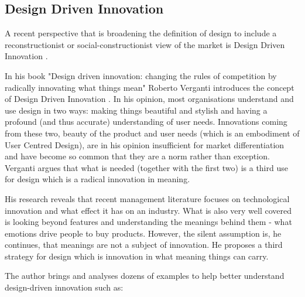 		\subsection{Design Driven Innovation}

A recent perspective that is broadening the definition of design to include a reconstructionist \citep{chan2005blue} or social-constructionist \citep{Prahalad2000} view of the market is Design Driven Innovation \citep{Liem2011, verganti2013design}.   

In his book "Design driven innovation: changing the rules of competition by radically innovating what things mean" Roberto Verganti introduces the concept of Design Driven Innovation \citep{verganti2013design}. In his opinion, most organisations understand and use design in two ways: making things beautiful and stylish and having a profound (and thus accurate) understanding of user needs. Innovations coming from these two, beauty of the product and user needs (which is an embodiment of User Centred Design), are in his opinion insufficient for market differentiation and have become so common that they are a norm rather than exception. Verganti argues that what is needed (together with the first two) is a third use for design which is a radical innovation in meaning.

His research reveals that recent management literature focuses on technological innovation and what effect it has on an industry. What is also very well covered is looking beyond features and understanding the meanings behind them - what emotions drive people to buy products. However, the silent assumption is, he continues, that meanings are not a subject of innovation. He proposes a third strategy for design which is innovation in what meaning things can carry.

The author brings and analyses dozens of examples to help better understand design-driven innovation such as:

